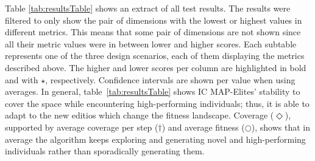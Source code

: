 
Table \ref{tab:resultsTable} shows an extract of all test results. The results were filtered to only show the pair of dimensions with the lowest or highest values in different metrics. This means that some pair of dimensions are not shown since all their metric values were in between lower and higher scores. Each subtable represents one of the three design scenarios, each of them displaying the metrics described above. The higher and lower scores per column are highlighted in bold and with $\star$, respectively. Confidence intervals are shown per value when using averages. In general, table~\ref{tab:resultsTable} shows IC MAP-Elites' stability to cover the space while encountering high-performing individuals; thus, it is able to adapt to the new editios which change the fitness landscape. Coverage ($\Diamond$), supported by average coverage per step ($\dagger$) and average fitness ($\bigcirc$), shows that in average the algorithm keeps exploring and generating novel and high-performing individuals rather than sporadically generating them.



